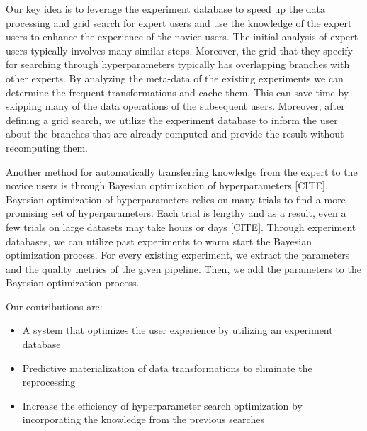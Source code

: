 Our key idea is to leverage the experiment database to speed up the data processing and grid search for expert users and use the knowledge of the expert users to enhance the experience of the novice users.
The initial analysis of expert users typically involves many similar steps.
Moreover, the grid that they specify for searching through hyperparameters typically has overlapping branches with other experts.
By analyzing the meta-data of the existing experiments we can determine the frequent transformations and cache them.
This can save time by skipping many of the data operations of the subsequent users.
Moreover, after defining a grid search, we utilize the experiment database to inform the user about the branches that are already computed and provide the result without recomputing them.

Another method for automatically transferring knowledge from the expert to the novice users is through Bayesian optimization of hyperparameters [CITE].
Bayesian optimization of hyperparameters relies on many trials to find a more promising set of hyperparameters. 
Each trial is lengthy and as a result, even a few trials on large datasets may take hours or days [CITE].
Through experiment databases, we can utilize past experiments to warm start the Bayesian optimization process.
For every existing experiment, we extract the parameters and the quality metrics of the given pipeline.
Then, we add the parameters to the Bayesian optimization process.

Our contributions are:
\begin{itemize}
\item A system that optimizes the user experience by utilizing an experiment database
\item Predictive materialization of data transformations to eliminate the reprocessing
\item Increase the efficiency of hyperparameter search optimization  by incorporating the knowledge from the previous searches
\end{itemize}